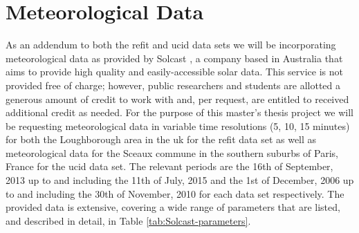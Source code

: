 \section{Meteorological Data}
\label{sec:Data-Description:Meteorological-Data}
As an addendum to both the \gls{refit} and \gls{ucid} data sets we will be incorporating meteorological data as provided by Solcast \cite{Solcast}, a company based in Australia that aims to provide high quality and easily-accessible solar data. This service is not provided free of charge; however, public researchers and students are allotted a generous amount of credit to work with and, per request, are entitled to received additional credit as needed. For the purpose of this master's thesis project we will be requesting meteorological data in variable time resolutions (5, 10, 15 minutes) for both the Loughborough area in the \gls{uk} for the \gls{refit} data set as well as meteorological data for the Sceaux commune in the southern suburbs of Paris, France for the \gls{ucid} data set. The relevant periods are the 16th of September, 2013 up to and including the 11th of July, 2015 and the 1st of December, 2006 up to and including the 30th of November, 2010 for each data set respectively. The provided data is extensive, covering a wide range of parameters that are listed, and described in detail, in Table \ref{tab:Solcast-parameters}.